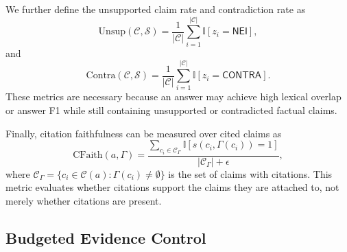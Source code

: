 We further define the unsupported claim rate and contradiction rate as
\begin{equation}
    \mathrm{Unsup}(\mathcal{C}, \mathcal{S})
    =
    \frac{1}{|\mathcal{C}|}
    \sum_{i=1}^{|\mathcal{C}|}
    \mathbb{I}\left[z_i = \mathsf{NEI}\right],
    \label{eq:unsupported_rate}
\end{equation}
and
\begin{equation}
    \mathrm{Contra}(\mathcal{C}, \mathcal{S})
    =
    \frac{1}{|\mathcal{C}|}
    \sum_{i=1}^{|\mathcal{C}|}
    \mathbb{I}\left[z_i = \mathsf{CONTRA}\right].
    \label{eq:contradiction_rate}
\end{equation}
These metrics are necessary because an answer may achieve high lexical overlap or answer F1 while still containing unsupported or contradicted factual claims.

Finally, citation faithfulness can be measured over cited claims as
\begin{equation}
    \mathrm{CFaith}(a, \Gamma)
    =
    \frac{
        \sum_{c_i \in \mathcal{C}_{\Gamma}}
        \mathbb{I}\left[s(c_i, \Gamma(c_i)) = 1\right]
    }{
        |\mathcal{C}_{\Gamma}| + \epsilon
    },
    \label{eq:citation_faithfulness}
\end{equation}
where $\mathcal{C}_{\Gamma} = \{c_i \in \mathcal{C}(a): \Gamma(c_i) \neq \emptyset\}$ is the set of claims with citations. This metric evaluates whether citations support the claims they are attached to, not merely whether citations are present.

\subsection{Budgeted Evidence Control}
\label{subsec:budgeted_control}

